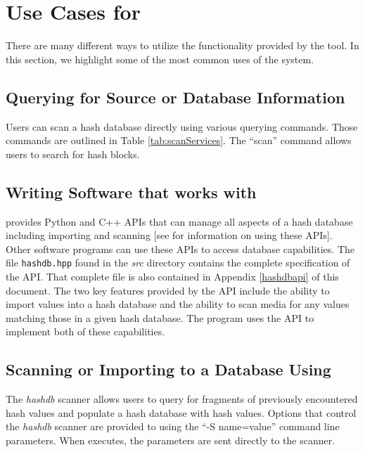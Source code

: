 \documentclass[11pt,fleqn]{article} %
\begin{document}
\section{Use Cases for \hdb}
\label{UseCases}
There are many different ways to utilize the functionality provided by the \hdb tool. In this section, we highlight some of the most common uses of the system.

\subsection{Querying for Source or Database Information}
 Users can scan a hash database directly using various querying commands. Those commands are outlined in Table \ref{tab:scanServices}.  The ``scan'' command allows users to search for hash blocks.\\

\subsection{Writing Software that works with \hdb}
\label{APISection}
\hdb provides Python and C++ APIs that can manage all aspects of a hash database
including importing and scanning [see \textbf{} for information on using these APIs].
Other software programs can use these APIs to access database capabilities. The file \texttt{hashdb.hpp} found in the \textit{src} directory contains the complete specification of the API. That complete file is also contained in Appendix \ref{hashdbapi} of this document.  The two key features provided by the API include the ability to import values into a hash database and the ability to scan media for any values matching those in a given hash database.  The \bulk program uses the \hdb API to implement both of these capabilities.\\

\subsection{Scanning or Importing to a Database Using \bulk}
\label{bulkextractorSection}
The \bulk \textit{hashdb} scanner allows users to query for fragments of previously encountered hash values and populate a hash database with hash values. Options that control the \textit{hashdb} scanner are provided to \bulk using the ``-S name=value'' command line parameters. When \bulk executes, the parameters are sent directly to the scanner.\\
\end{document}
